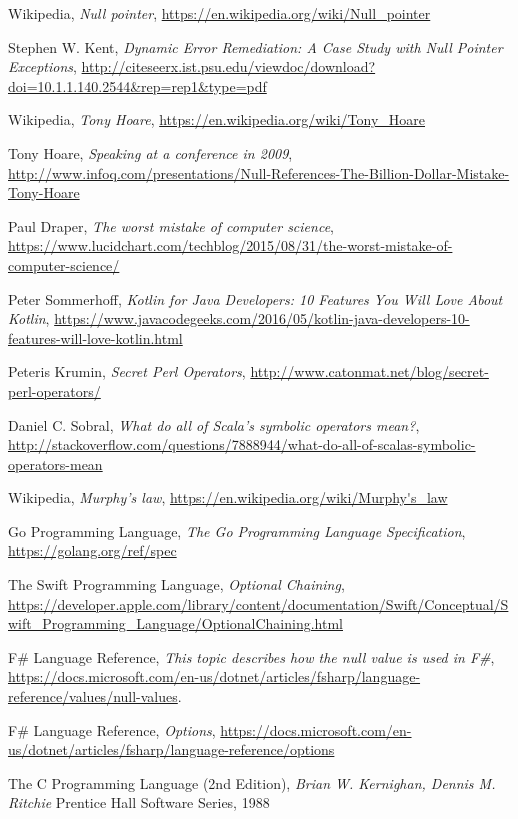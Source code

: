 \documentclass[11pt, a4paper]{report}
\begin{document}
\begin{thebibliography}{100}
	
    Wikipedia,
    \emph{Null pointer},
    \url{https://en.wikipedia.org/wiki/Null_pointer}

    Stephen W. Kent,
    \textit{Dynamic Error Remediation: A Case Study with Null Pointer Exceptions},
    \url{http://citeseerx.ist.psu.edu/viewdoc/download?doi=10.1.1.140.2544&rep=rep1&type=pdf}

    Wikipedia,
    \textit{Tony Hoare},
    \url{https://en.wikipedia.org/wiki/Tony_Hoare}
    
    Tony Hoare,
    \textit{Speaking at a conference in 2009},
    \url{http://www.infoq.com/presentations/Null-References-The-Billion-Dollar-Mistake-Tony-Hoare}

    Paul Draper,
    \textit{The worst mistake of computer science},
    \url{https://www.lucidchart.com/techblog/2015/08/31/the-worst-mistake-of-computer-science/}

 	Peter Sommerhoff,
 	\textit{Kotlin for Java Developers: 10 Features You Will Love About Kotlin},
 	\url{https://www.javacodegeeks.com/2016/05/kotlin-java-developers-10-features-will-love-kotlin.html}

    Peteris Krumin,
    \textit{Secret Perl Operators},
    \url{http://www.catonmat.net/blog/secret-perl-operators/}

    Daniel C. Sobral,
    \textit{What do all of Scala's symbolic operators mean?},
    \url{http://stackoverflow.com/questions/7888944/what-do-all-of-scalas-symbolic-operators-mean}
    
    Wikipedia,
    \textit{Murphy's law},
    \url{https://en.wikipedia.org/wiki/Murphy's_law}

    Go Programming Language,
    \textit{The Go Programming Language Specification},
    \url{https://golang.org/ref/spec}

    The Swift Programming Language,
    \textit{Optional Chaining},
    \url{https://developer.apple.com/library/content/documentation/Swift/Conceptual/Swift_Programming_Language/OptionalChaining.html}
    
    F\# Language Reference,
    \textit{This topic describes how the null value is used in F\#},
    \url{https://docs.microsoft.com/en-us/dotnet/articles/fsharp/language-reference/values/null-values}.

    F\# Language Reference,
    \textit{Options},
    \url{https://docs.microsoft.com/en-us/dotnet/articles/fsharp/language-reference/options}

    The C Programming Language (2nd Edition),
    \textit{Brian W. Kernighan, Dennis M. Ritchie}
    Prentice Hall Software Series, 1988
\end{thebibliography}
\end{document}
